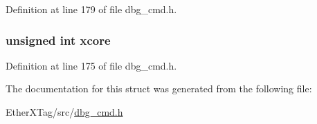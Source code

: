 Definition at line 179 of file dbg\-\_\-cmd.\-h.

\hypertarget{structdbg__cmd__type__remove__break_a78357326dd562d441c3c73f5676ac638}{
\subsubsection[{xcore}]{\setlength{\rightskip}{0pt plus 5cm}unsigned int xcore}}\label{structdbg__cmd__type__remove__break_a78357326dd562d441c3c73f5676ac638}


Definition at line 175 of file dbg\-\_\-cmd.\-h.



The documentation for this struct was generated from the following file\-:\begin{DoxyCompactItemize}
\item 
Ether\-X\-Tag/src/\hyperlink{dbg__cmd_8h}{dbg\-\_\-cmd.\-h}\end{DoxyCompactItemize}
